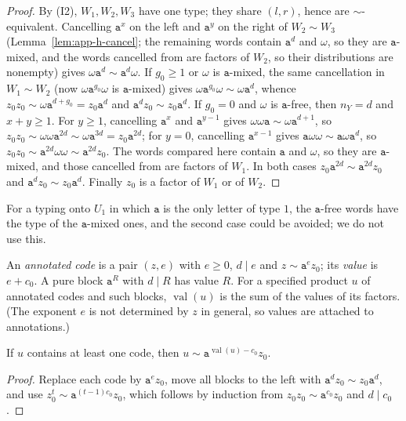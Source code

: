 \begin{proof}
By (I2), $W_1,W_2,W_3$ have one type; they share $(l,r)$, hence are
$\sim$-equivalent.  Cancelling $\mathtt a^x$ on the left and $\mathtt a^y$ on the
right of $W_2\sim W_3$ (Lemma~\ref{lem:app-h-cancel}; the remaining words contain
$\mathtt a^d$ and $\omega$, so they are $\mathtt a$-mixed, and the words cancelled
from are factors of $W_2$, so their distributions are nonempty) gives
$\omega\mathtt a^d\sim\mathtt a^d\omega$.  If $g_0\ge1$
or $\omega$ is $\mathtt a$-mixed, the same cancellation in $W_1\sim W_2$ (now
$\omega\mathtt a^{g_0}\omega$ is $\mathtt a$-mixed) gives $\omega\mathtt
a^{g_0}\omega\sim\omega\mathtt a^d$, whence $z_0z_0\sim\omega\mathtt
a^{d+g_0}=z_0\mathtt a^d$ and $\mathtt a^dz_0\sim z_0\mathtt a^d$.  If $g_0=0$ and
$\omega$ is $\mathtt a$-free, then $n_Y=d$ and $x+y\ge1$.  For $y\ge1$,
cancelling $\mathtt a^x$ and $\mathtt a^{y-1}$ gives $\omega\omega\mathtt
a\sim\omega\mathtt a^{d+1}$, so $z_0z_0\sim\omega\omega\mathtt a^{2d}\sim\omega\mathtt
a^{3d}=z_0\mathtt a^{2d}$; for $y=0$, cancelling $\mathtt a^{x-1}$ gives $\mathtt
a\omega\omega\sim\mathtt a\omega\mathtt a^d$, so $z_0z_0\sim\mathtt
a^{2d}\omega\omega\sim\mathtt a^{2d}z_0$.  The words compared here contain
$\mathtt a$ and $\omega$, so they are $\mathtt a$-mixed, and those cancelled from
are factors of $W_1$.  In both cases $z_0\mathtt
a^{2d}\sim\mathtt a^{2d}z_0$ and $\mathtt a^dz_0\sim z_0\mathtt a^d$.  Finally $z_0$
is a factor of $W_1$ or of $W_2$.
\end{proof}

For a typing onto $U_1$ in which $\mathtt a$ is the only letter of type $1$, the
$\mathtt a$-free words have the type of the $\mathtt a$-mixed ones, and the
second case could be avoided; we do not use this.

An \emph{annotated code} is a pair $(z,e)$ with $e\ge0$, $d\mid e$ and $z\sim
\mathtt a^ez_0$; its \emph{value} is $e+c_0$.  A pure block $\mathtt a^R$ with
$d\mid R$ has value $R$.  For a specified product $u$ of annotated codes and
such blocks, $\operatorname{val}(u)$ is the sum of the values of its factors.
(The exponent $e$ is not determined by $z$ in general, so values are attached
to annotations.)

\begin{lemma}
\label{lem:app-h-collapse}
If $u$ contains at least one code, then $u\sim\mathtt
a^{\operatorname{val}(u)-c_0}z_0$.
\end{lemma}

\begin{proof}
Replace each code by $\mathtt a^ez_0$, move all blocks to the left with
$\mathtt a^dz_0\sim z_0\mathtt a^d$, and use $z_0^t\sim\mathtt a^{(t-1)c_0}z_0$,
which follows by induction from $z_0z_0\sim\mathtt a^{c_0}z_0$ and $d\mid c_0$.
\end{proof}

